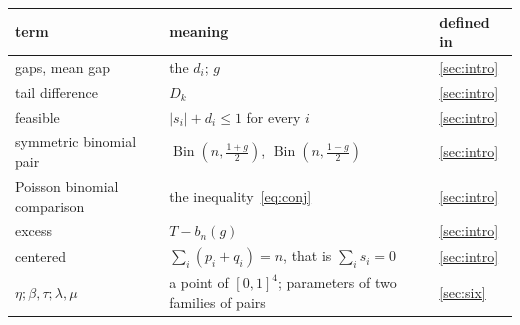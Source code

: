 \documentclass[11pt,a4paper]{article}
\numberwithin{equation}{section}
\theoremstyle{remark}
\newcommand{\Bin}{\operatorname{Bin}}
\begin{document}
\begin{center}
\small
\begin{tabular}{p{}p{}p{}}
\toprule
term & meaning & defined in\\
\midrule
gaps, mean gap & the $d_i$; $g$ & \cref{sec:intro}\\
tail difference & $D_k$ & \cref{sec:intro}\\
feasible & $|s_i|+d_i\le1$ for every $i$ & \cref{sec:intro}\\
symmetric binomial pair & $\Bin(n,\frac{1+g}2)$, $\Bin(n,\frac{1-g}2)$ & \cref{sec:intro}\\
Poisson binomial comparison & the inequality~\eqref{eq:conj} & \cref{sec:intro}\\
excess & $T-b_n(g)$ & \cref{sec:intro}\\
centered & $\sum_i(p_i+q_i)=n$, that is $\sum_is_i=0$ & \cref{sec:intro}\\
$\eta;\beta,\tau;\lambda,\mu$ & a point of $[0,1]^4$; parameters of two families of pairs & \cref{sec:six}\\
\bottomrule
\end{tabular}
\end{center}
\end{document}
